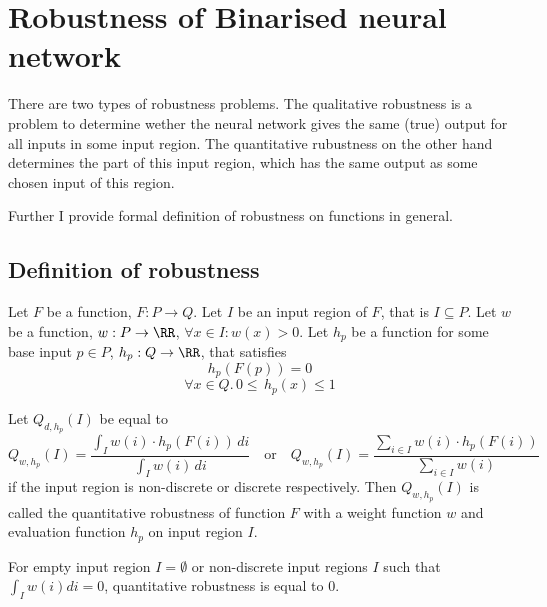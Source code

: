 \section{Robustness of Binarised neural network}

There are two types of robustness problems. The qualitative robustness
is a problem to determine wether the neural network gives the same (true)
output for all inputs in some input region. The quantitative rubustness
on the other hand determines the part of this input region, which has
the same output as some chosen input of this region.

Further I provide formal definition of robustness on functions in general.

\subsection{Definition of robustness}

\begin{definition}\label{def:quantitative_robustness}
    Let $F$ be a function, $F: P \to Q$.
    Let $I$ be an input region of $F$, that is $I \subseteq P$.
    Let $w$ be a function, $w: P\to \RR$, $\forall x\in I: w(x) > 0$.
    Let $h_p$ be a function for some base input $p\in P$, $h_p: Q\to \RR$, that satisfies
    \begin{equation*}
        h_p(F(p)) = 0
    \end{equation*}
    \begin{equation*}
        \forall x\in Q .\, 0 \leq \, h_p(x) \leq 1 
    \end{equation*}

    \noindent
    Let $Q_{d, h_p}(I)$ be equal to
    \begin{equation*}
        Q_{w, h_p}(I) = \frac{\int_I w(i)\cdot h_p(F(i)) \, di}{\int_I w(i) \, di}
        \hspace{1em} \text{or} \hspace{1em}
        Q_{w, h_p}(I) = \frac{\sum_{i\in I} w(i)\cdot h_p(F(i))}{\sum_{i\in I} w(i)}
    \end{equation*}
    if the input region is non-discrete or discrete respectively.
    Then $Q_{w, h_p}(I)$ is called the quantitative robustness of function $F$
    with a weight function $w$ and evaluation function $h_p$ on input region $I$.

    For empty input region $I = \emptyset$
    or non-discrete input regions $I$ such that $\int_I w(i) di = 0$,
    quantitative robustness is equal to $0$.
\end{definition}

